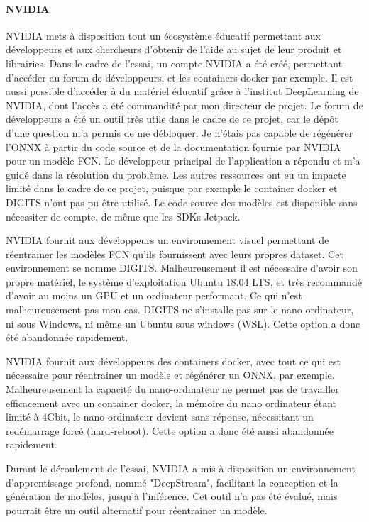 \paragraph{NVIDIA}
\par NVIDIA mets à disposition tout un écosystème éducatif permettant aux développeurs et aux chercheurs d'obtenir de l'aide au sujet de leur produit et librairies. Dans le cadre de l'essai, un compte NVIDIA a été créé, permettant d'accéder au forum de développeurs, et les containers  docker par exemple. Il est aussi possible d'accéder à du matériel éducatif grâce à l'institut DeepLearning de NVIDIA, dont l'accès a été commandité par mon directeur de projet. Le forum de développeurs a été un outil très utile dans le cadre de ce projet, car le dépôt d'une question m'a permis de me débloquer. Je n'étais pas capable de régénérer l'ONNX à partir du code source et de la documentation fournie par NVIDIA pour un modèle FCN. Le développeur principal de l'application a répondu et m'a guidé dans la résolution du problème. Les autres ressources ont eu un impacte limité dans le cadre de ce projet, puisque par exemple le container docker et DIGITS n'ont pas pu être utilisé. Le code source des modèles est disponible sans nécessiter de compte, de même que les SDKs Jetpack.
\par NVIDIA fournit aux développeurs un environnement visuel permettant de réentrainer les modèles FCN qu'ils fournissent avec leurs propres dataset. Cet environnement se nomme DIGITS. Malheureusement il est nécessaire d'avoir son propre matériel, le système d'exploitation Ubuntu 18.04 LTS, et très recommandé d'avoir au moins un GPU et un ordinateur performant. Ce qui n'est malheureusement pas mon cas. DIGITS ne s'installe pas sur le nano ordinateur, ni sous Windows, ni même un Ubuntu sous windows (WSL). Cette option a donc été abandonnée rapidement. 
\par NVIDIA fournit aux développeurs des containers docker, avec tout ce qui est nécessaire pour réentrainer un modèle et régénérer un ONNX, par exemple. Malheureusement la capacité du nano-ordinateur ne permet pas de travailler efficacement avec un container docker, la mémoire du nano ordinateur étant limité à 4Gbit, le nano-ordinateur devient sans réponse, nécessitant un redémarrage forcé (hard-reboot). Cette option a donc été aussi abandonnée rapidement. 
\par Durant le déroulement de l'essai, NVIDIA a mis à disposition un environnement d'apprentissage profond, nommé "DeepStream", facilitant la conception et la génération de modèles, jusqu'à l'inférence. Cet outil n'a pas été évalué, mais pourrait être un outil alternatif pour réentrainer un modèle.